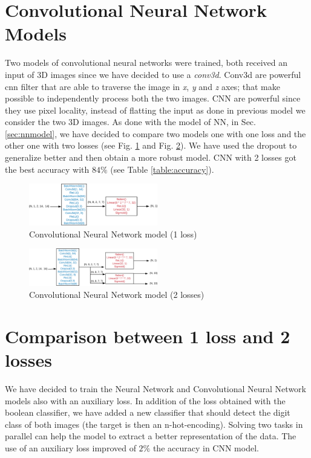 \documentclass[journal, a4paper]{IEEEtran}
\begin{document}
\section{Convolutional Neural Network Models}
\label{sec:cnnmodel}
Two models of convolutional neural networks were trained, both received an input of 3D images since we have decided to use a \textit{conv3d}. Conv3d are powerful cnn filter that are able to traverse the image in \textit{x}, \textit{y} and \textit{z} axes; that make possible to independently process both the two images. CNN are powerful since they use pixel locality, instead of flatting the input as done in previous model we consider the two 3D images. As done with the model of NN, in Sec. \ref{sec:nnmodel}, we have decided to compare two models one with one loss and the other one with two losses (see Fig. \ref{fig:cnn1} and Fig. \ref{fig:cnn2}). 
We have used the dropout to generalize better and then obtain a more robust model. CNN with 2 losses got the best accuracy with $84\%$  (see Table \ref{table:accuracy}).
\begin{figure}[!h]
    \centering
    \includegraphics[width=0.5\textwidth]{cnn1.png}
    \caption{Convolutional Neural Network model (1 loss)}
    \label{fig:cnn1}
\end{figure}
\begin{figure}[!h]
    \centering
    \includegraphics[width=0.5\textwidth]{cnn2.png}
    \caption{Convolutional Neural Network model (2 losses)}
    \label{fig:cnn2}
\end{figure}

\section{Comparison between 1 loss and 2 losses}
\label{sec:auxilaryloss}
We have decided to train the Neural Network and Convolutional Neural Network models also with an auxiliary loss. In addition of the loss obtained with the boolean classifier, we have added a new classifier that should detect the digit class of both images (the target is then an n-hot-encoding). Solving two tasks in parallel can help the model to extract a better representation of the data. The use of an auxiliary loss improved of $2\%$ the accuracy in CNN model.
\end{document}
